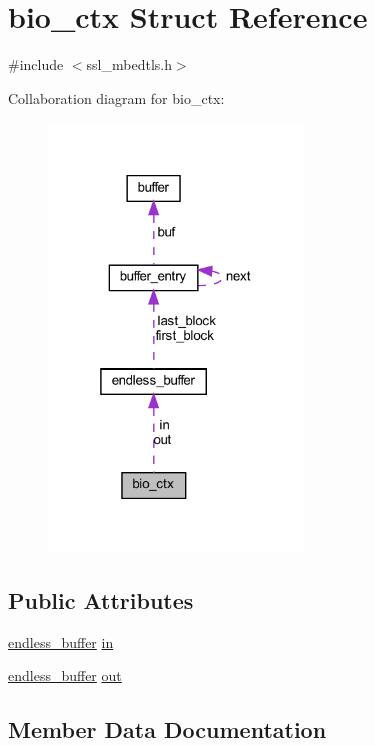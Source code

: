 \hypertarget{structbio__ctx}{}\section{bio\+\_\+ctx Struct Reference}
\label{structbio__ctx}


{\ttfamily \#include $<$ssl\+\_\+mbedtls.\+h$>$}



Collaboration diagram for bio\+\_\+ctx\+:
\nopagebreak
\begin{figure}[H]
\begin{center}
\leavevmode
\includegraphics[width=193pt]{structbio__ctx__coll__graph}
\end{center}
\end{figure}
\subsection*{Public Attributes}
\begin{DoxyCompactItemize}
\item 
\hyperlink{structendless__buffer}{endless\+\_\+buffer} \hyperlink{structbio__ctx_abc9a3f277ae77f310c1e3b79ad48ae26}{in}
\item 
\hyperlink{structendless__buffer}{endless\+\_\+buffer} \hyperlink{structbio__ctx_aa9c670dd99822fb36115f6ebb7e4ccd2}{out}
\end{DoxyCompactItemize}


\subsection{Member Data Documentation}
\hypertarget{structbio__ctx_abc9a3f277ae77f310c1e3b79ad48ae26}{}
